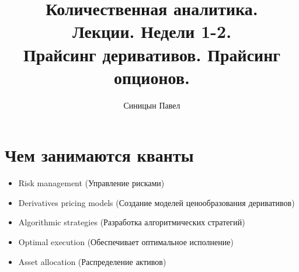 \documentclass{article}
\title{Количественная аналитика.\\
Лекции. Недели 1-2. \\
Прайсинг деривативов. Прайсинг опционов.}
\author{Синицын Павел}
\begin{document}
\maketitle

\setcounter{tocdepth}{1} %
\renewcommand\contentsname{Contents}
\tableofcontents
\newpage




\renewcommand{\labelitemi}{\tiny$\bullet$}
\renewcommand{\figurename}{Рис.}



 \section{Чем занимаются кванты}
\begin{itemize}
    \item Risk management (Управление рисками)
    \item Derivatives pricing models (Создание моделей ценообразования деривативов)
    \item Algorithmic strategies (Разработка алгоритмических стратегий)
    \item Optimal execution (Обеспечивает оптимальное исполнение)
    \item Asset allocation (Распределение активов)
\end{itemize}
\end{document}
